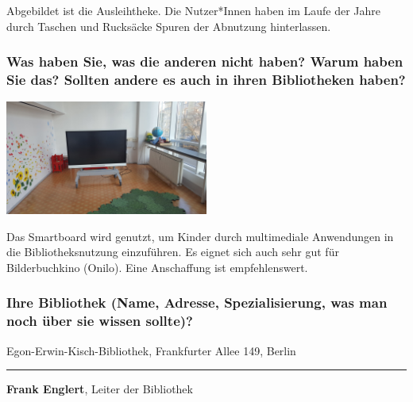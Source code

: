 Abgebildet ist die Ausleihtheke. Die Nutzer*Innen haben im Laufe der
Jahre durch Taschen und Rucksäcke Spuren der Abnutzung hinterlassen.

\hypertarget{was-haben-sie-was-die-anderen-nicht-haben-warum-haben-sie-das-sollten-andere-es-auch-in-ihren-bibliotheken-haben}{%
\subsubsection*{Was haben Sie, was die anderen nicht haben? Warum haben Sie
das? Sollten andere es auch in ihren Bibliotheken
haben?}\label{was-haben-sie-was-die-anderen-nicht-haben-warum-haben-sie-das-sollten-andere-es-auch-in-ihren-bibliotheken-haben}}

\begin{center}
\includegraphics[width=0.5\textwidth]{kisch/img/smartboard.jpg}
\end{center}

Das Smartboard wird genutzt, um Kinder durch multimediale Anwendungen in
die Bibliotheksnutzung einzuführen. Es eignet sich auch sehr gut für
Bilderbuchkino (Onilo). Eine Anschaffung ist empfehlenswert.

\hypertarget{ihre-bibliothek-name-adresse-spezialisierung-was-man-noch-uxfcber-sie-wissen-sollte}{%
\subsubsection*{Ihre Bibliothek (Name, Adresse, Spezialisierung, was man noch
über sie wissen
sollte)?}\label{ihre-bibliothek-name-adresse-spezialisierung-was-man-noch-uxfcber-sie-wissen-sollte}}

Egon-Erwin-Kisch-Bibliothek, Frankfurter Allee 149, Berlin

\begin{center}\rule{0.5\linewidth}{\linethickness}\end{center}

\textbf{Frank Englert}, Leiter der Bibliothek
